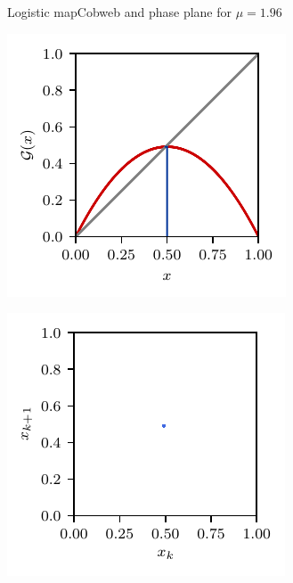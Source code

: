 \documentclass[usenames,dvipsnames,svgnames,10pt,aspectratio=169]{beamer}
\begin{document}
\begin{frame}[t, c]{Logistic map}{Cobweb and phase plane for $\mu = 1.96$}
	\begin{minipage}{.48\textwidth}
		\centering
		\includegraphics[width=.75\textwidth]{logistic_map_cobweb_plot_3}
	\end{minipage}%
	\begin{minipage}{.48\textwidth}
		\centering
		\includegraphics[width=.75\textwidth]{logistic_map_phase_plane_3}
	\end{minipage}

	\vspace{1cm}
\end{frame}
\end{document}
